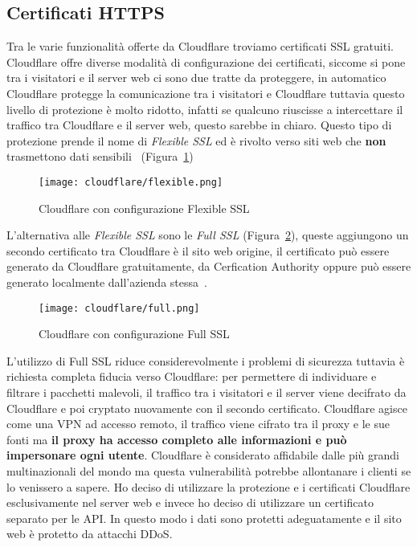 \subsection{Certificati HTTPS}%
\label{sub:certificati}

Tra le varie funzionalit\`a offerte da Cloudflare troviamo certificati SSL gratuiti. Cloudflare offre diverse modalit\`a di configurazione dei certificati, siccome si pone tra i visitatori e il server web ci sono due tratte da proteggere, in automatico Cloudflare protegge la comunicazione tra i visitatori e Cloudflare tuttavia questo livello di protezione \`e molto ridotto, infatti se qualcuno riuscisse a intercettare il traffico tra Cloudflare e il server web, questo sarebbe in chiaro. Questo tipo di protezione prende il nome di \emph{Flexible SSL} ed \`e rivolto verso siti web che \textbf{non} trasmettono dati sensibili~\cite{cloudflare-ssl} (Figura~\ref{fig:flexiblessl})

\begin{figure}[htpb]
    \centering
    \texttt{[image: cloudflare/flexible.png]}
    \caption{Cloudflare con configurazione Flexible SSL}%
    \label{fig:flexiblessl}
\end{figure}

L'alternativa alle \emph{Flexible SSL} sono le \emph{Full SSL} (Figura~\ref{fig:fullssl}), queste aggiungono un secondo certificato tra Cloudflare \`e il sito web origine, il certificato pu\`o essere generato da Cloudflare gratuitamente, da Cerfication Authority oppure pu\`o essere generato localmente dall'azienda stessa~\cite{cloudflare-help}.

\begin{figure}[htpb]
    \centering
    \texttt{[image: cloudflare/full.png]}
    \caption{Cloudflare con configurazione Full SSL}%
    \label{fig:fullssl}
\end{figure}

L'utilizzo di Full SSL riduce considerevolmente i problemi di sicurezza tuttavia \`e richiesta completa fiducia verso Cloudflare: per permettere di individuare e filtrare i pacchetti malevoli, il traffico tra i visitatori e il server viene decifrato da Cloudflare e poi cryptato nuovamente con il secondo certificato. Cloudflare agisce come una VPN ad accesso remoto, il traffico viene cifrato tra il proxy e le sue fonti ma \textbf{il proxy ha accesso completo alle informazioni e pu\`o impersonare ogni utente}. Cloudflare \`e considerato affidabile dalle pi\`u grandi multinazionali del mondo ma questa vulnerabilit\`a potrebbe allontanare i clienti se lo venissero a sapere. Ho deciso di utilizzare la protezione e i certificati Cloudflare esclusivamente nel server web e invece ho deciso di utilizzare un certificato separato per le API. In questo modo i dati sono protetti adeguatamente e il sito web \`e protetto da attacchi DDoS\@.
